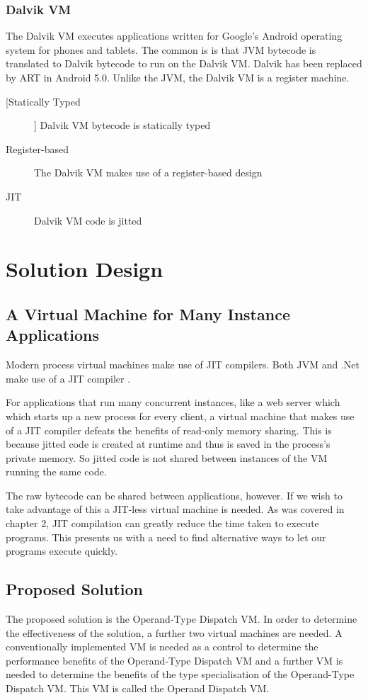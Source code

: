 \documentclass[english,a4paper]{article}
\begin{document}
\subsubsection{Dalvik VM}
The Dalvik VM executes applications written for Google's Android
operating system for phones and tablets. The common is is that JVM
bytecode is translated to Dalvik bytecode to run on the Dalvik
VM. Dalvik has been replaced by ART in Android 5.0. Unlike the JVM,
the Dalvik VM is a register machine.
\begin{description}
\item[[Statically Typed]] Dalvik VM bytecode is statically typed
\item[Register-based] The Dalvik VM makes use of a register-based
  design
\item[JIT] Dalvik VM code is jitted
\end{description}

\section{Solution Design}

\subsection{A Virtual Machine for Many Instance Applications}
Modern process virtual machines make use of JIT compilers. Both JVM
and .Net make use of a JIT compiler \cite{MSDN,Oracle}. 

For applications that run many concurrent instances, like a web server
which which starts up a new process for every client, a virtual
machine that makes use of a JIT compiler defeats the benefits of
read-only memory sharing. This is because jitted code is created at 
runtime and thus is saved in the process's private memory. So jitted 
code is not shared between instances of the VM running the same 
code. 

The raw bytecode can be shared between applications, however. If we 
wish to take advantage of this a JIT-less virtual machine is needed. 
As was covered in chapter 2, JIT compilation can greatly reduce 
the time taken to execute programs. This presents us with a need to 
find alternative ways to let our programs execute quickly.

\subsection{Proposed Solution}
The proposed solution is the Operand-Type Dispatch VM. In order to 
determine the effectiveness of the solution, a further two virtual 
machines are needed. A conventionally implemented VM is needed as a 
control to determine the performance benefits of the Operand-Type 
Dispatch VM and a further VM is needed to determine the benefits of 
the type specialisation of the Operand-Type Dispatch VM. This VM is 
called the Operand Dispatch VM. 
\end{document}
